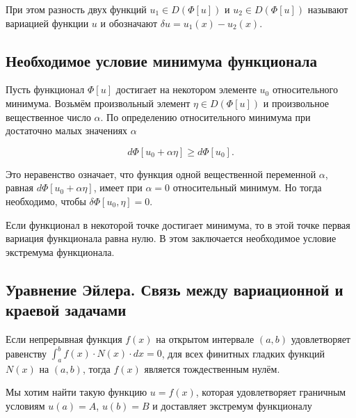 \documentclass{article}
\begin{document}
\noindent При этом разность двух функций $u_{1} \in D(\Phi[u])$ и $u_{2} \in D(\Phi[u])$ называют вариацией функции $u$ и обозначают $\delta u = u_{1}(x) - u_{2}(x)$.


\subsection{Необходимое условие минимума функционала}\label{sub_section_minimum_conditions}

Пусть функционал $\Phi[u]$ достигает на некотором элементе $u_{0}$ относительного минимума. Возьмём произвольный элемент $\eta \in D(\Phi[u])$ и произвольное вещественное число $\alpha$. По определению относительного минимума при достаточно малых значениях $\alpha$

\begin{displaymath}
     d\Phi[u_{0} + \alpha\eta] \geq d\Phi[u_{0}].
\end{displaymath}

\noindent Это неравенство означает, что функция одной вещественной переменной $\alpha$, равная $d\Phi[u_{0} + \alpha\eta]$, имеет при $\alpha = 0$ относительный минимум. Но тогда необходимо, чтобы  $\delta \Phi[u_{0}, \eta] = 0$.

\begin{warn}[Важно!]
	Если функционал в некоторой точке достигает минимума, то в этой точке первая вариация функционала равна нулю. В этом заключается необходимое условие экстремума функционала.
\end{warn}


\subsection{Уравнение Эйлера. Связь между вариационной и краевой задачами}

\begin{warn}
	Если непрерывная функция $f(x)$ на открытом интервале $(a, b)$ удовлетворяет равенству $\int_{a}^{b} f(x) \cdot N(x) \cdot dx = 0$, 
	\noindent для всех финитных гладких функций $N(x)$ на $(a, b)$, тогда $f(x)$ является тождественным нулём.
\end{warn}

Мы хотим найти такую функцию $u = f(x)$, которая удовлетворяет граничным условиям $u(a) = A$, $u(b) = B$ и доставляет экстремум функционалу
\end{document}
